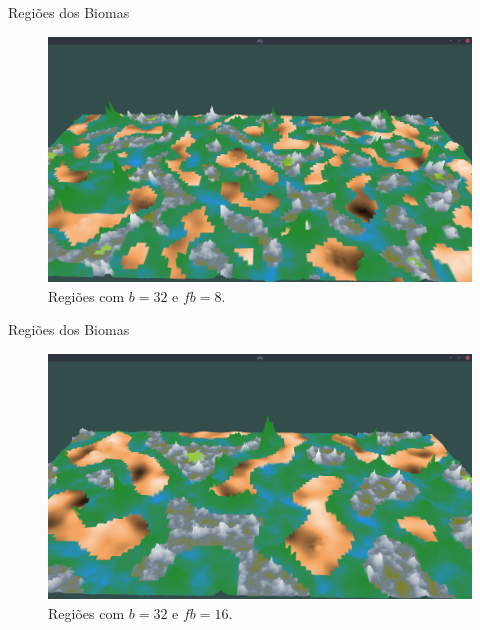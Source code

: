 \begin{frame}{Regiões dos Biomas}
    \begin{figure}[H]
        \centering
        \includegraphics[width=.9\textwidth]{img/re2bfb/fb/8b32.png}
        \caption{Regiões com $b = 32$ e $fb = 8$.}
        \label{fig:img_re2bfb_fb_8b32}
    \end{figure}
    
    
\end{frame}

\begin{frame}{Regiões dos Biomas}
    \begin{figure}[H]
        \centering
        \includegraphics[width=.9\textwidth]{img/re2bfb/fb/16b32.png}
        \caption{Regiões com $b = 32$ e $fb = 16$.}
        \label{fig:img_re2bfb_fb_16b32}
    \end{figure}
    
    
\end{frame}

